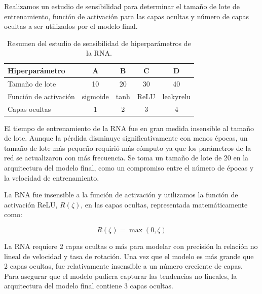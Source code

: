 \documentclass[12pt,a4paper]{article}
\begin{document}
Realizamos un estudio de sensibilidad para determinar el tamaño de lote de entrenamiento, función de activación para las capas ocultas y número de capas ocultas a ser utilizados por el modelo final.

\begin{table}[H]
\centering
\caption{Resumen del estudio de sensibilidad de hiperparámetros de la RNA.}
\label{tab:sensibilidad}
\begin{tabular}{@{}lcccc@{}}
\toprule
Hiperparámetro & A & B & C & D \\
\midrule
Tamaño de lote & 10 & 20 & 30 & 40 \\
Función de activación & sigmoide & tanh & ReLU & leakyrelu \\
Capas ocultas & 1 & 2 & 3 & 4 \\
\bottomrule
\end{tabular}
\end{table}

El tiempo de entrenamiento de la RNA fue en gran medida insensible al tamaño de lote. Aunque la pérdida disminuye significativamente con menos épocas, un tamaño de lote más pequeño requirió más cómputo ya que los parámetros de la red se actualizaron con más frecuencia. Se toma un tamaño de lote de 20 en la arquitectura del modelo final, como un compromiso entre el número de épocas y la velocidad de entrenamiento.

La RNA fue insensible a la función de activación y utilizamos la función de activación ReLU, $R(\zeta)$, en las capas ocultas, representada matemáticamente como:

\begin{equation}
R(\zeta) = \max(0, \zeta)
\end{equation}

La RNA requiere 2 capas ocultas o más para modelar con precisión la relación no lineal de velocidad y tasa de rotación. Una vez que el modelo es más grande que 2 capas ocultas, fue relativamente insensible a un número creciente de capas. Para asegurar que el modelo pudiera capturar las tendencias no lineales, la arquitectura del modelo final contiene 3 capas ocultas.
\end{document}
